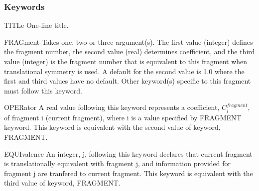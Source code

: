 \subsubsection{Keywords}
\begin{keywordlist}
\item[TITLe]
One-line title.
\item[FRAGment]
Takes one, two or three argument(s).
The first value (integer) defines the fragment number,
the second value (real) determines coefficient,
and the third value (integer) is the fragment number that is equivalent
to this fragment when translational symmetry is used.
A default for the second value is 1.0 where the first and third values have
no default.
Other keyword(s) specific to this fragment must follow this keyword.
\item[OPERator]
A real value following this keyword represents a coefficient, $C_i^{fragment}$,
of fragment i (current fragment), where i is a value specified by FRAGMENT keyword.
This keyword is equivalent with the second value of keyword, FRAGMENT.
\item[EQUIvalence]
An integer, j, following this keyword declares that current fragment
is translationally equivalent with fragment j, and information provided for
fragment j are tranfered to current fragment.
This keyword is equivalent with the third value of keyword, FRAGMENT.

\end{keywordlist}
